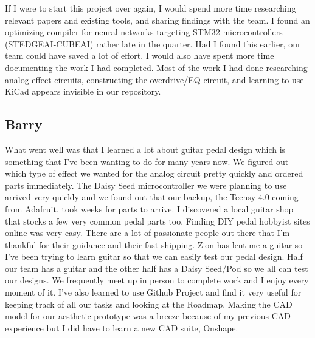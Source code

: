\documentclass[12pt]{article}
\begin{document}
If I were to start this project over again, I would spend more time researching relevant papers and existing tools, and sharing findings with the team. I found an optimizing compiler for neural networks targeting STM32 microcontrollers (STEDGEAI-CUBEAI) rather late in the quarter. Had I found this earlier, our team could have saved a lot of effort. I would also have spent more time documenting the work I had completed. Most of the work I had done researching analog effect circuits, constructing the overdrive/EQ circuit, and learning to use KiCad appears invisible in our repository. 

\subsection*{Barry}
What went well was that I learned a lot about guitar pedal design which is something that I've been wanting to do for many years now. We figured out which type of effect we wanted for the analog circuit pretty quickly and ordered parts immediately. The Daisy Seed microcontroller we were planning to use arrived very quickly and we found out that our backup, the Teensy 4.0 coming from Adafruit, took weeks for parts to arrive. I discovered a local guitar shop that stocks a few very common pedal parts too. Finding DIY pedal hobbyist sites online was very easy. There are a lot of passionate people out there that I'm thankful for their guidance and their fast shipping. Zion has lent me a guitar so I've been trying to learn guitar so that we can easily test our pedal design. Half our team has a guitar and the other half has a Daisy Seed/Pod so we all can test our designs. We frequently meet up in person to complete work and I enjoy every moment of it. I've also learned to use Github Project and find it very useful for keeping track of all our tasks and looking at the Roadmap. Making the CAD model for our aesthetic prototype was a breeze because of my previous CAD experience but I did have to learn a new CAD suite, Onshape.
\end{document}
